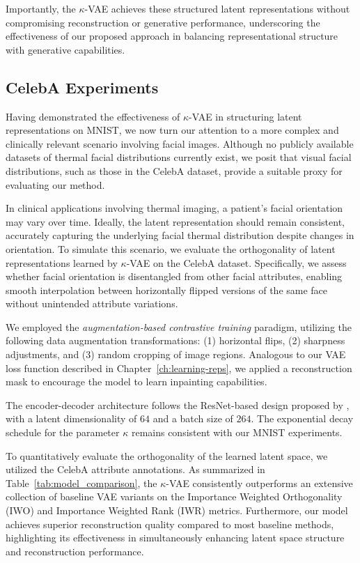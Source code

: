 Importantly, the $\kappa$-VAE achieves these structured latent representations without compromising reconstruction or generative performance, underscoring the effectiveness of our proposed approach in balancing representational structure with generative capabilities.

\subsection{CelebA Experiments}
Having demonstrated the effectiveness of $\kappa$-VAE in structuring latent representations on MNIST, we now turn our attention to a more complex and clinically relevant scenario involving facial images. Although no publicly available datasets of thermal facial distributions currently exist, we posit that visual facial distributions, such as those in the CelebA dataset, provide a suitable proxy for evaluating our method.

In clinical applications involving thermal imaging, a patient's facial orientation may vary over time. Ideally, the latent representation should remain consistent, accurately capturing the underlying facial thermal distribution despite changes in orientation. To simulate this scenario, we evaluate the orthogonality of latent representations learned by $\kappa$-VAE on the CelebA dataset. Specifically, we assess whether facial orientation is disentangled from other facial attributes, enabling smooth interpolation between horizontally flipped versions of the same face without unintended attribute variations.

We employed the \textit{augmentation-based contrastive training} paradigm, utilizing the following data augmentation transformations: (1) horizontal flips, (2) sharpness adjustments, and (3) random cropping of image regions. Analogous to our VAE loss function described in Chapter~\ref{ch:learning-reps}, we applied a reconstruction mask to encourage the model to learn inpainting capabilities.

The encoder-decoder architecture follows the ResNet-based design proposed by \cite{chadebec2022pythae}, with a latent dimensionality of $64$ and a batch size of $264$. The exponential decay schedule for the parameter $\kappa$ remains consistent with our MNIST experiments.

To quantitatively evaluate the orthogonality of the learned latent space, we utilized the CelebA attribute annotations. As summarized in Table~\ref{tab:model_comparison}, the $\kappa$-VAE consistently outperforms an extensive collection of baseline VAE variants \cite{chadebec2022pythae} on the Importance Weighted Orthogonality (IWO) and Importance Weighted Rank (IWR) metrics. Furthermore, our model achieves superior reconstruction quality compared to most baseline methods, highlighting its effectiveness in simultaneously enhancing latent space structure and reconstruction performance.

